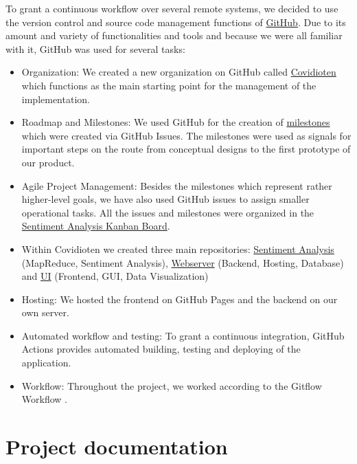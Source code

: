 \documentclass[
    fontsize=12pt,
    headings=small,
    parskip=half,           %
    bibliography=totoc,
    numbers=noenddot,       %
    open=any,               %
    ]{scrreprt}
\begin{document}
To grant a continuous workflow over several remote systems, we decided to use the version control and source code management functions of \href{https://github.com/Covidioten}{GitHub}. Due to its amount and variety of functionalities and tools and because we were all familiar with it, GitHub was used for several tasks:
\begin{itemize}
    \item Organization: We created a new organization on GitHub called \href{https://github.com/Covidioten}{Covidioten} which functions as the main starting point for the management of the implementation.
    \item Roadmap and Milestones: We used GitHub for the creation of \href{https://github.com/Covidioten/UI/milestones}{milestones} which were created via GitHub Issues. The milestones were used as signals for important steps on the route from conceptual designs to the first prototype of our product. 
    \item Agile Project Management: Besides the milestones which represent rather higher-level goals, we have also used GitHub issues to assign smaller operational tasks. All the issues and milestones were organized in the \href{https://github.com/orgs/Covidioten/projects/1}{Sentiment Analysis Kanban Board}.
    \item Within Covidioten we created three main repositories: \href{https://github.com/Covidioten/BAPraktikumSentimentAnalyse}{Sentiment Analysis} (MapReduce, Sentiment Analysis), \href{https://github.com/Covidioten/WebServer}{Webserver} (Backend, Hosting, Database) and \href{https://github.com/Covidioten/UI}{UI} (Frontend, GUI, Data Visualization) 
    \item Hosting: We hosted the frontend on GitHub Pages and the backend on our own server.
    \item Automated workflow and testing: To grant a continuous integration, GitHub Actions provides automated building, testing and deploying of the application. 
    \item Workflow: Throughout the project, we worked according to the Gitflow Workflow \cite{GitflowWF}. 
\end{itemize}

\newpage
\chapter{Project documentation}
\end{document}
